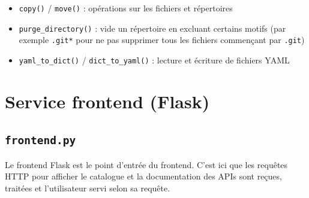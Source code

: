 \begin{itemize}
    \item[$\bullet$] \texttt{copy()} / \texttt{move()} : opérations sur les fichiers et répertoires
    \item[$\bullet$] \texttt{purge\_directory()} : vide un répertoire en excluant certains motifs (par exemple \texttt{.git*} pour ne pas supprimer tous les fichiers commençant par \texttt{.git})
    \item[$\bullet$] \texttt{yaml\_to\_dict()} / \texttt{dict\_to\_yaml()} : lecture et écriture de fichiers YAML
\end{itemize}
\section{Service frontend (Flask)}
\subsection{\texttt{frontend.py}}
Le frontend Flask est le point d'entrée du frontend. C'est ici que les requêtes HTTP pour afficher le catalogue et la documentation des APIs sont reçues, traitées et l'utilisateur servi selon sa requête.

